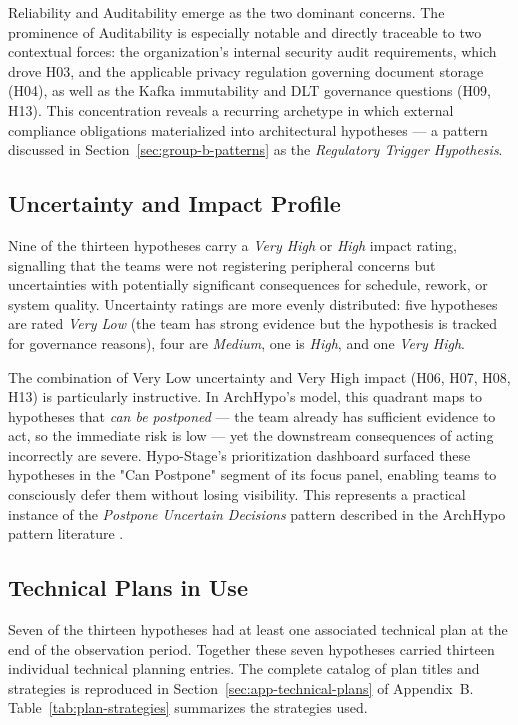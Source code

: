 Reliability and Auditability emerge as the two dominant concerns. The prominence
of Auditability is especially notable and directly traceable to two contextual
forces: the organization's internal security audit requirements, which drove H03,
and the applicable privacy regulation governing document storage (H04),
as well as the Kafka immutability and DLT governance questions (H09, H13).
This concentration reveals a recurring archetype in which external compliance
obligations materialized into architectural hypotheses — a pattern discussed in
Section~\ref{sec:group-b-patterns} as the \textit{Regulatory Trigger Hypothesis}.

\subsection{Uncertainty and Impact Profile}
\label{subsec:uncertainty-impact}

Nine of the thirteen hypotheses carry a \textit{Very High} or \textit{High}
impact rating, signalling that the teams were not registering peripheral concerns
but uncertainties with potentially significant consequences for schedule, rework,
or system quality. Uncertainty ratings are more evenly distributed: five
hypotheses are rated \textit{Very Low} (the team has strong evidence but the
hypothesis is tracked for governance reasons), four are \textit{Medium}, one
is \textit{High}, and one \textit{Very High}.

The combination of Very Low uncertainty and Very High impact (H06, H07, H08,
H13) is particularly instructive. In ArchHypo's model, this quadrant maps to
hypotheses that \textit{can be postponed} — the team already has sufficient
evidence to act, so the immediate risk is low — yet the downstream consequences
of acting incorrectly are severe. Hypo-Stage's prioritization dashboard surfaced
these hypotheses in the "Can Postpone" segment of its focus panel, enabling
teams to consciously defer them without losing visibility. This represents
a practical instance of the \textit{Postpone Uncertain Decisions} pattern
described in the ArchHypo pattern literature \citep{silva2024patterns}.

\subsection{Technical Plans in Use}
\label{subsec:technical-plans}

Seven of the thirteen hypotheses had at least one associated technical plan at
the end of the observation period. Together these seven hypotheses carried thirteen
individual technical planning entries. The complete catalog of plan titles and
strategies is reproduced in Section~\ref{sec:app-technical-plans} of Appendix~B.
Table~\ref{tab:plan-strategies} summarizes
the strategies used.

